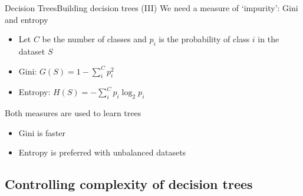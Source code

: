 \documentclass[10pt,compress]{beamer} %
\begin{document}
\begin{frame}{Decision Trees}{Building decision trees (III)}
    We need a measure of `impurity': Gini and entropy

    \begin{itemize}
    \item Let $C$ be the number of classes and $p_i$ is the probability of class $i$ in the dataset $S$
        \item Gini: $G(S) = 1 - \sum_i^C p_i^2$
        \item Entropy: $H(S) = - \sum_i^C p_i \log_2 p_i$
    \end{itemize}

    Both measures are used to learn trees
    \begin{itemize}
        \item Gini is faster
        \item Entropy is preferred with unbalanced datasets
    \end{itemize}
\end{frame}




\subsection{Controlling complexity of decision trees}
\end{document}
